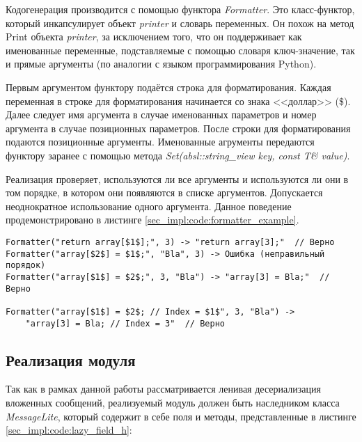 Кодогенерация производится с помощью функтора \textit{Formatter}.
Это класс-функтор, который инкапсулирует объект \textit{printer} и словарь переменных.
Он похож на метод Print объекта \textit{printer}, за исключением того, что он поддерживает как именованные переменные, подставляемые с помощью словаря ключ-значение, так и прямые аргументы (по аналогии с языком программирования Python).

Первым аргументом функтору подаётся строка для форматирования. Каждая переменная в строке для форматирования начинается со знака <<доллар>> (\$).
Далее следует имя аргумента в случае именованных параметров и номер аргумента в случае позиционных параметров. 
После строки для форматирования подаются позиционные аргументы.
Именованные агрументы передаются функтору заранее с помощью метода \textit{Set(absl::string\_view key, const T\& value)}.

Реализация проверяет, используются ли все аргументы и используются ли они в том порядке, в котором они появляются в списке аргументов.
Допускается неоднократное использование одного аргумента.
Данное поведение продемонстрировано в листинге \ref{sec_impl:code:formatter_example}.

\begin{lstlisting}[style=CodeListing, label=sec_impl:code:formatter_example, caption={Пример валидации, реализованной в функторе Formatter}]
Formatter("return array[$1$];", 3) -> "return array[3];"  // Верно
Formatter("array[$2$] = $1$;", "Bla", 3) -> Ошибка (неправильный порядок)
Formatter("array[$1$] = $2$;", 3, "Bla") -> "array[3] = Bla;"  // Верно

Formatter("array[$1$] = $2$; // Index = $1$", 3, "Bla") ->
    "array[3] = Bla; // Index = 3"  // Верно
\end{lstlisting}

\subsection{Реализация модуля}

Так как в рамках данной работы рассматривается ленивая десериализация вложенных сообщений, реализуемый модуль должен быть наследником класса \textit{MessageLite},
который содержит в себе поля и методы, представленные в листинге \ref{sec_impl:code:lazy_field_h}:

